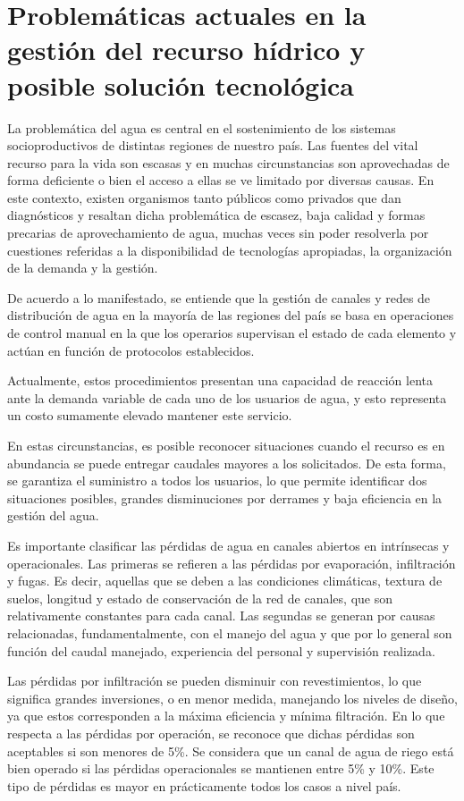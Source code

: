 \section{Problemáticas actuales en la gestión del recurso hídrico y posible solución tecnológica}
La problemática del agua es central en el sostenimiento de los sistemas socioproductivos de distintas regiones de nuestro país. Las fuentes del vital recurso para la vida son escasas y en muchas circunstancias son aprovechadas de forma deficiente o bien el acceso a ellas se ve limitado por diversas causas. En este contexto, existen organismos tanto  públicos como privados que dan diagnósticos y resaltan dicha problemática de escasez, baja calidad y formas precarias de aprovechamiento de agua, muchas veces sin poder resolverla por cuestiones referidas a la disponibilidad de tecnologías apropiadas, la organización de la demanda y la gestión. 	 

De acuerdo a lo manifestado, se entiende que la gestión de canales y redes de distribución de agua en la mayoría de las regiones del país se basa en operaciones de control manual en la que los operarios supervisan el estado de cada elemento y actúan en función de protocolos establecidos.

Actualmente, estos procedimientos presentan una capacidad de reacción lenta ante la demanda variable de cada uno de los usuarios de agua, y esto representa un costo sumamente elevado mantener este servicio.

En estas circunstancias, es posible reconocer situaciones cuando el recurso es en abundancia se puede entregar caudales mayores a los solicitados. De esta forma, se garantiza el suministro a todos los usuarios, lo que permite identificar dos situaciones posibles, grandes disminuciones por derrames y baja eficiencia en la gestión del agua.

Es importante clasificar las pérdidas de agua en canales abiertos en intrínsecas y operacionales. Las primeras se refieren a las pérdidas por evaporación, infiltración y fugas. Es decir, aquellas que se deben a las
condiciones climáticas, textura de suelos, longitud y estado de conservación de la red de canales, que son relativamente constantes para cada canal. Las segundas se generan por causas relacionadas, fundamentalmente, con el manejo del agua y que por lo general son función del caudal manejado, experiencia del personal y supervisión realizada.

Las pérdidas por infiltración se pueden disminuir con revestimientos, lo que significa grandes inversiones, o en menor medida, manejando los niveles de diseño, ya que estos corresponden a la máxima eficiencia y mínima filtración.
En lo que respecta a las pérdidas por operación, se reconoce que dichas pérdidas son aceptables si son menores de 5\%. Se considera que un canal de agua de riego está bien operado si las pérdidas operacionales se mantienen entre 5\% y 10\%. Este tipo de pérdidas es mayor en prácticamente todos los casos a nivel país.		

